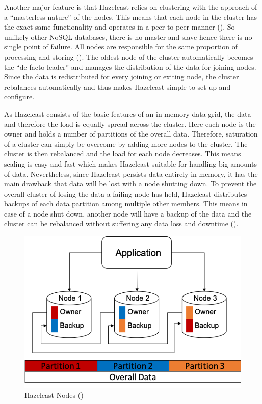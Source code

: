 Another major feature is that Hazelcast relies on clustering with the approach of a “masterless nature” of the nodes. This means that each node in the cluster has the exact same functionality and operates in a peer-to-peer manner (\cite{johns2015}). So unlikely other NoSQL databases, there is no master and slave hence there is no single point of failure. All nodes are responsible for the same proportion of processing and storing (\cite{hazelcastmanual}). The oldest node of the cluster automatically becomes the “de facto leader” and manages the distribution of the data for joining nodes. Since the data is redistributed for every joining or exiting node, the cluster rebalances automatically and thus makes Hazelcast simple to set up and configure.

As Hazelcast consists of the basic features of an in-memory data grid, the data and therefore the load is equally spread across the cluster. Here each node is the owner and holds a number of partitions of the overall data.
Therefore, saturation of a cluster can simply be overcome by adding more nodes to the cluster. The cluster is then rebalanced and the load for each node decreases. This means scaling is easy and fast which makes Hazelcast suitable for handling big amounts of data.
Nevertheless, since Hazelcast persists data entirely in-memory, it has the main drawback that data will be lost with a node shutting down. To prevent the overall cluster of losing the data a failing node has held, Hazelcast distributes backups of each data partition among multiple other members. This means in case of a node shut down, another node will have a backup of the data and the cluster can be rebalanced without suffering any data loss and downtime (\cite{johns2015}).
\begin{figure}[H]
    \centering
    \includegraphics[scale=0.6]{content/images/hazelcast-nodes.png}
    \caption{Hazelcast Nodes (\cite{johns2015})}
\end{figure}
